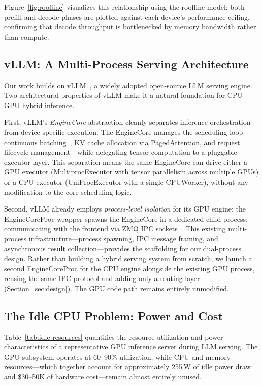 \documentclass[10pt,conference]{IEEEtran}
\begin{document}
Figure~\ref{fig:roofline} visualizes this relationship using the roofline model: both prefill and decode phases are plotted against each device's performance ceiling, confirming that decode throughput is bottlenecked by memory bandwidth rather than compute.

\subsection{vLLM: A Multi-Process Serving Architecture}
\label{sec:bg-vllm}

Our work builds on vLLM~\cite{kwon2023vllm}, a widely adopted open-source LLM serving engine.
Two architectural properties of vLLM make it a natural foundation for CPU-GPU hybrid inference.

First, vLLM's \emph{EngineCore} abstraction cleanly separates inference orchestration from device-specific execution.
The EngineCore manages the scheduling loop---continuous batching~\cite{yu2022orca}, KV cache allocation via PagedAttention, and request lifecycle management---while delegating tensor computation to a pluggable executor layer.
This separation means the same EngineCore can drive either a GPU executor (MultiprocExecutor with tensor parallelism across multiple GPUs) or a CPU executor (UniProcExecutor with a single CPUWorker), without any modification to the core scheduling logic.

Second, vLLM already employs \emph{process-level isolation} for its GPU engine: the EngineCoreProc wrapper spawns the EngineCore in a dedicated child process, communicating with the frontend via ZMQ IPC sockets~\cite{hintjens2013zeromq}.
This existing multi-process infrastructure---process spawning, IPC message framing, and asynchronous result collection---provides the scaffolding for our dual-process design.
Rather than building a hybrid serving system from scratch, we launch a second EngineCoreProc for the CPU engine alongside the existing GPU process, reusing the same IPC protocol and adding only a routing layer (Section~\ref{sec:design}).
The GPU code path remains entirely unmodified.

\subsection{The Idle CPU Problem: Power and Cost}
\label{sec:bg-idle}

Table~\ref{tab:idle-resources} quantifies the resource utilization and power characteristics of a representative GPU inference server during LLM serving.
The GPU subsystem operates at 60--90\% utilization, while CPU and memory resources---which together account for approximately 255\,W of idle power draw and \$30--50K of hardware cost---remain almost entirely unused.
\end{document}
